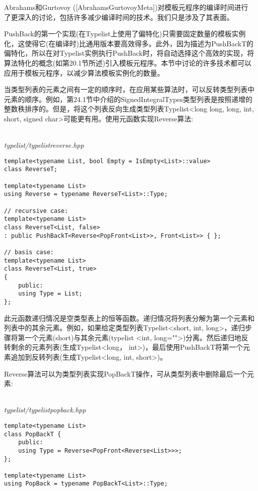 \begin{tcolorbox}[colback=webgreen!5!white,colframe=webgreen!75!black]
\hspace*{0.75cm}Abrahams和Gurtovoy ([AbrahamsGurtovoyMeta])对模板元程序的编译时间进行了更深入的讨论，包括许多减少编译时间的技术。我们只是涉及了其表面。
\end{tcolorbox}

PushBack的第一个实现(在Typelist上使用了偏特化)只需要固定数量的模板实例化，这使得它(在编译时)比通用版本要高效得多。此外，因为描述为PushBackT的偏特化，所以在对Typelist实例执行PushBack时，将自动选择这个高效的实现，将算法特化的概念(如第20.1节所述)引入模板元程序。本节中讨论的许多技术都可以应用于模板元程序，以减少算法模板实例化的数量。


当类型列表的元素之间有一定的顺序时，在应用某些算法时，可以反转类型列表中元素的顺序。例如，第24.1节中介绍的SignedIntegralTypes类型列表是按照递增的整数秩排序的。但是，将这个列表反向生成类型列表Typelist<long long, long, int, short, signed char>可能更有用。使用元函数实现Reverse算法:

\hspace*{\fill} \\ %
\noindent
\textit{typelist/typelistreverse.hpp}
\begin{lstlisting}[style=styleCXX]
template<typename List, bool Empty = IsEmpty<List>::value>
class ReverseT;

template<typename List>
using Reverse = typename ReverseT<List>::Type;

// recursive case:
template<typename List>
class ReverseT<List, false>
: public PushBackT<Reverse<PopFront<List>>, Front<List>> { };

// basis case:
template<typename List>
class ReverseT<List, true>
{
	public:
	using Type = List;
};
\end{lstlisting}

此元函数递归情况是空类型表上的恒等函数。递归情况将列表分解为第一个元素和列表中的其余元素。例如，如果给定类型列表Typelist<short, int, long>，递归步骤将第一个元素(short)与其余元素(typelist <int, long="">)分离。然后递归地反转剩余的元素列表(生成Typelist<long， int>)，最后使用PushBackT将第一个元素追加到反转列表(生成Typelist<long, int, short>)。

Reverse算法可以为类型列表实现PopBackT操作，可从类型列表中删除最后一个元素:

\hspace*{\fill} \\ %
\noindent
\textit{typelist/typelistpopback.hpp}
\begin{lstlisting}[style=styleCXX]
template<typename List>
class PopBackT {
	public:
	using Type = Reverse<PopFront<Reverse<List>>>;
};

template<typename List>
using PopBack = typename PopBackT<List>::Type;
\end{lstlisting}

